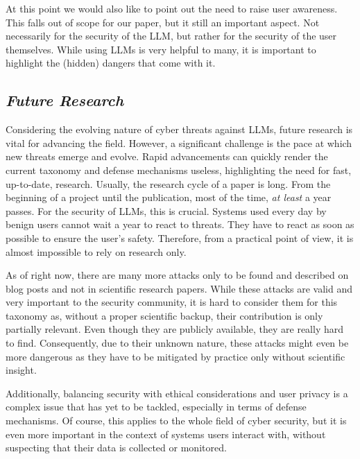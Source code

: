 At this point we would also like to point out the need to raise user awareness. This falls out of scope for our paper, but it still an important aspect. Not necessarily for the security of the LLM, but rather for the security of the user themselves. While using LLMs is very helpful to many, it is important to highlight the (hidden) dangers that come with it.

\subsection{\textit{Future Research}}
Considering the evolving nature of cyber threats against LLMs, future research is vital for advancing the field. 
However, a significant challenge is the pace at which new threats emerge and evolve.
Rapid advancements can quickly render the current taxonomy and defense mechanisms useless, highlighting the need for fast, up-to-date, research.
Usually, the research cycle of a paper is long. From the beginning of a project until the publication, most of the time, \textit{at least} a year passes. For the security of LLMs, this is crucial. Systems used every day by benign users cannot wait a year to react to threats. They have to react as soon as possible to ensure the user's safety. Therefore, from a practical point of view, it is almost impossible to rely on research only.

As of right now, there are many more attacks only to be found and described on blog posts and not in scientific research papers. 
While these attacks are valid and very important to the security community, it is hard to consider them for this taxonomy as, without a proper scientific backup, their contribution is only partially relevant. 
Even though they are publicly available, they are really hard to find. Consequently, due to their unknown nature, these attacks might even be more dangerous as they have to be mitigated by practice only without scientific insight.

Additionally, balancing security with ethical considerations and user privacy is a complex issue that has yet to be tackled, especially in terms of defense mechanisms. Of course, this applies to the whole field of cyber security, but it is even more important in the context of systems users interact with, without suspecting that their data is collected or monitored.